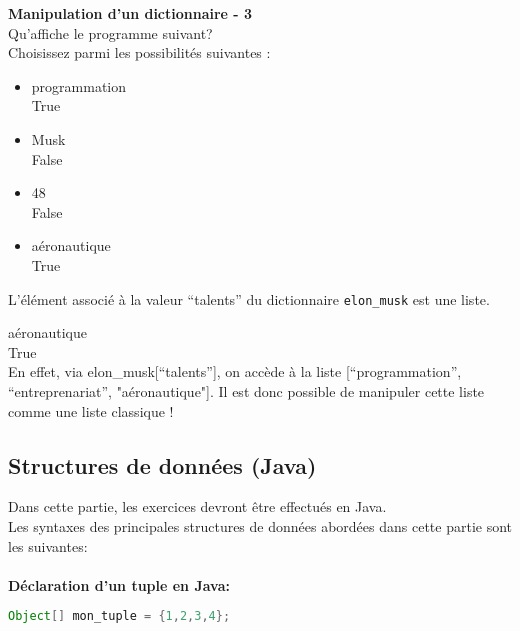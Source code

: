     \begin{Exercice}[5 minutes] \textbf{Manipulation d'un dictionnaire - 3}\\
      	Qu'affiche le programme suivant? \\
       
      	 
      	
      	Choisissez parmi les possibilités suivantes : \\
      	
      	\begin{itemize}
      	\item programmation \\
      	True\\
      	\item Musk \\
      	False\\
      	\item 48 \\
      	False\\
      	\item aéronautique \\
      	True \\
      	\end{itemize}
    
        \begin{conseil}
            L'élément associé à la valeur ``talents'' du dictionnaire \lstinline{elon_musk} est une liste.
        \end{conseil}
        
        \begin{solution}
            aéronautique \\
            True \\
            
            En effet, via elon\_musk[``talents''], on accède à la liste [``programmation'', ``entreprenariat'', "aéronautique"]. Il est donc possible de manipuler cette liste comme une liste classique !
        \end{solution}
    \end{Exercice}
    
    \subsection{Structures de données (Java)}
    Dans cette partie, les exercices devront être effectués en Java. \\
    Les syntaxes des principales structures de données abordées dans cette partie sont les suivantes: \\\\
    \textbf{Déclaration d'un tuple en Java:}
     \begin{lstlisting}[language=Java]
              Object[] mon_tuple = {1,2,3,4}; \end{lstlisting} 
              
